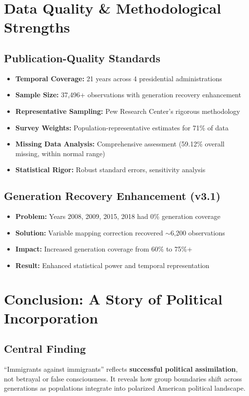 \documentclass[11pt,letterpaper]{article}
\begin{document}
\section{Data Quality \& Methodological Strengths}

\subsection{Publication-Quality Standards}
\begin{itemize}
    \item \textbf{Temporal Coverage:} 21 years across 4 presidential administrations
    \item \textbf{Sample Size:} 37,496+ observations with generation recovery enhancement
    \item \textbf{Representative Sampling:} Pew Research Center's rigorous methodology
    \item \textbf{Survey Weights:} Population-representative estimates for 71\% of data
    \item \textbf{Missing Data Analysis:} Comprehensive assessment (59.12\% overall missing, within normal range)
    \item \textbf{Statistical Rigor:} Robust standard errors, sensitivity analysis
\end{itemize}

\subsection{Generation Recovery Enhancement (v3.1)}
\begin{itemize}
    \item \textbf{Problem:} Years 2008, 2009, 2015, 2018 had 0\% generation coverage
    \item \textbf{Solution:} Variable mapping correction recovered $\sim$6,200 observations
    \item \textbf{Impact:} Increased generation coverage from 60\% to 75\%+
    \item \textbf{Result:} Enhanced statistical power and temporal representation
\end{itemize}

\section{Conclusion: A Story of Political Incorporation}

\subsection{Central Finding}
``Immigrants against immigrants'' reflects \textbf{successful political assimilation}, not betrayal or false consciousness. It reveals how group boundaries shift across generations as populations integrate into polarized American political landscape.
\end{document}
